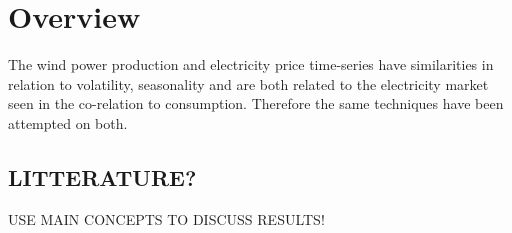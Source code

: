 \section{Overview}
The wind power production and electricity price time-series have similarities in relation to volatility, seasonality and are both related to the electricity market seen in the co-relation to consumption. Therefore the same techniques have been attempted on both.

\subsection{LITTERATURE?}
USE MAIN CONCEPTS TO DISCUSS RESULTS!
